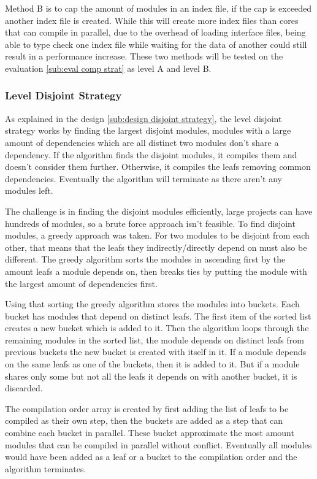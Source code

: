 Method B is to cap the amount of modules in an index file, if the cap is
exceeded another index file is created. While this will create more index files
than cores that can compile in parallel, due to the overhead of loading
interface files, being able to type check one index file while waiting for the
data of another could still result in a performance increase. These two methods
will be tested on the evaluation \cref{sub:eval comp strat} as level A
and level B.

\subsubsection{Level Disjoint Strategy} \label{sub:imp disj strategy}

As explained in the design \cref{sub:design disjoint strategy}, the
level disjoint strategy works by finding the largest disjoint modules, modules
with a large amount of dependencies which are all distinct two modules don't
share a dependency. If the algorithm finds the disjoint modules, it compiles
them and doesn't consider them further. Otherwise, it compiles the leafs
removing common dependencies. Eventually the algorithm will terminate as there
aren't any modules left.

The challenge is in finding the disjoint modules efficiently, large projects
can have hundreds of modules, so a brute force approach isn't feasible. To find
disjoint modules, a greedy approach was taken. For two modules to be disjoint
from each other, that means that the leafs they indirectly/directly depend on
must also be different. The greedy algorithm sorts the modules in ascending
first by the amount leafs a module depends on, then breaks ties by putting the
module with the largest amount of  dependencies first.

Using that sorting the greedy algorithm stores the modules into buckets. Each
bucket has modules that depend on distinct leafs. The first item of the sorted
list creates a new bucket which is added to it. Then the algorithm loops through
the remaining modules in the sorted list, the module depends on distinct leafs
from previous buckets the new bucket is created with itself in it. If a
module depends on the same leafs as one of the buckets, then it is added to it.
But if a module shares only some but not all the leafs it depends on with
another bucket, it is discarded.

The compilation order array is created by first adding the list of leafs to be
compiled as their own step, then the buckets are added as a step that can
combine each bucket in parallel. These bucket approximate the most amount
modules that can be compiled in parallel without conflict. Eventually all
modules would have been added as a leaf or a bucket to the compilation order
and the algorithm terminates.


